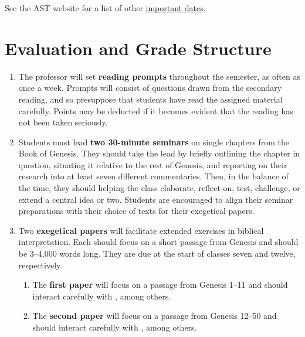 \documentclass[titlepage]{article}
\begin{document}
See the AST website for a list of other \href{http://www.astheology.ns.ca/students/academic-dates.html}{important dates}.

\section{Evaluation and Grade Structure}
\label{evaluation}

\begin{enumerate}

	\item The professor will set \textbf{reading prompts} throughout the
	semester, as often as once a week. Prompts will consist of questions
	drawn from the secondary reading, and so presuppose that students
	have read the assigned material carefully. Points may be deducted if
	it becomes evident that the reading has not been taken seriously.

	\item Students must lead \textbf{two 30-minute seminars} on single
	chapters from the Book of Genesis. They should take the lead by
	briefly outlining the chapter in question, situating it relative to
	the rest of Genesis, and reporting on their research into at least
	seven different commentaries. Then, in the balance of the time, they
	should helping the class elaborate, reflect on, test, challenge, or
	extend a central idea or two. Students are encouraged to align their
	seminar preparations with their choice of texts for their exegetical
	papers.

	\item Two \textbf{exegetical papers} will facilitate extended
	exercises in biblical interpretation. Each should focus on a short
	passage from Genesis and should be 3--4,000 words long. They are due
	at the start of classes seven and twelve, respectively.

	\begin{enumerate}

		\item The \textbf{first paper} will focus on a passage from
		Genesis 1--11 and should interact carefully with
		\cite{anderson}, among others.

		\item The \textbf{second paper} will focus on a passage from
		Genesis 12--50 and should interact carefully with
		\cite{levenson}, among others.

	\end{enumerate}

\end{enumerate}
\end{document}
